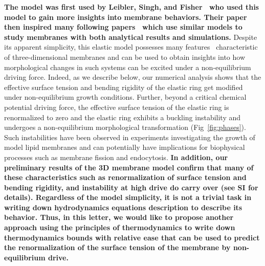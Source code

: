 \documentclass[amsmath,preprintnumbers,10pt,nofootinbib,prl,twocolumn]{revtex4-1}
\begin{document}
\textbf{The model was first used by Leibler, Singh, and Fisher~\cite{Fisher1989} who used this model to gain more insights into membrane behaviors.  Their paper then inspired many following papers~\cite{Fisher1989a,Rudnick1991,Rajesh2008,Nelson2009} which use similar models to study membranes with both analytical results and simulations.} Despite its apparent simplicity, this elastic model possesses many features~\cite{W.Helfrich1973,Fisher1989,Fisher1989a,Rudnick1991,Ramaswamy2000,Rao2001,Solon2006,Rajesh2008,Hannezo2011,Loubet2012,Nelson2009} characteristic of three-dimensional membranes and can be used to obtain insights into how morphological changes in such systems can be excited under a non-equilibrium driving force. Indeed, as we describe below, our numerical analysis shows that the effective surface tension and bending rigidity of the elastic ring get modified under non-equilibrium growth conditions. Further, beyond a critical chemical potential driving force, the effective surface tension of the elastic ring is renormalized to zero and the elastic ring exhibits a buckling instability and undergoes a non-equilibrium morphological transformation (Fig~\ref{fig:phases}). Such instabilities have been observed in experiments investigating the growth of model lipid membranes \cite{Solon2006} and can potentially have implications for biophysical processes such as membrane fission and endocytosis. \textbf{In addition, our preliminary results of the 3D membrane model confirm that many of these characteristics such as renormalization of surface tension and bending rigidity, and instability at high drive do carry over (see SI for details). Regardless of the model simplicity, it is not a trivial task in writing down hydrodynamics equations description to describe its behavior. Thus, in this letter, we would like to propose another approach using the principles of thermodynamics to write down thermodynamics bounds with relative ease that can be used to predict the renormalization of the surface tension of the membrane by non-equilibrium drive.}
\end{document}
